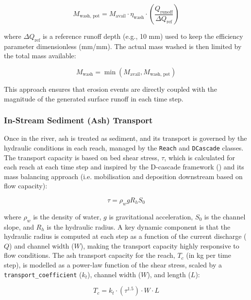 \documentclass[12pt, a4paper]{article}
\begin{document}
\begin{equation}
M_{\text{wash, pot}} = M_{\text{avail}} \cdot \eta_{\text{wash}} \cdot \left( \frac{Q_{\text{runoff}}}{\Delta Q_{\text{ref}}} \right)
\end{equation}

where $\Delta Q_{\text{ref}}$ is a reference runoff depth (e.g., 10 mm) used to keep the efficiency parameter dimensionless (mm/mm). The actual mass washed is then limited by the total mass available:

\begin{equation}
M_{\text{wash}} = \min(M_{\text{avail}}, M_{\text{wash, pot}})
\end{equation}

This approach ensures that erosion events are directly coupled with the magnitude of the generated surface runoff in each time step.

\subsubsection{In-Stream Sediment (Ash) Transport}
Once in the river, ash is treated as sediment, and its transport is governed by the hydraulic conditions in each reach, managed by the \texttt{Reach} and \texttt{DCascade} classes. The transport capacity is based on bed shear stress, $\tau$, which is calculated for each reach at each time step and inspired by the D-cascade framework (\citealp{Tangi2022}) and its mass balancing approach (i.e. mobilisation and deposition downstream based on flow capacity):

\begin{equation}
\tau = \rho_w g R_h S_0
\end{equation}

where $\rho_w$ is the density of water, $g$ is gravitational acceleration, $S_0$ is the channel slope, and $R_h$ is the hydraulic radius. A key dynamic component is that the hydraulic radius is computed at each step as a function of the current discharge ($Q$) and channel width ($W$), making the transport capacity highly responsive to flow conditions. The ash transport capacity for the reach, $T_c$ (in kg per time step), is modelled as a power-law function of the shear stress, scaled by a \texttt{transport\_coefficient} ($k_t$), channel width ($W$), and length ($L$):

\begin{equation}
T_c = k_t \cdot (\tau^{1.5}) \cdot W \cdot L
\end{equation}
\end{document}
